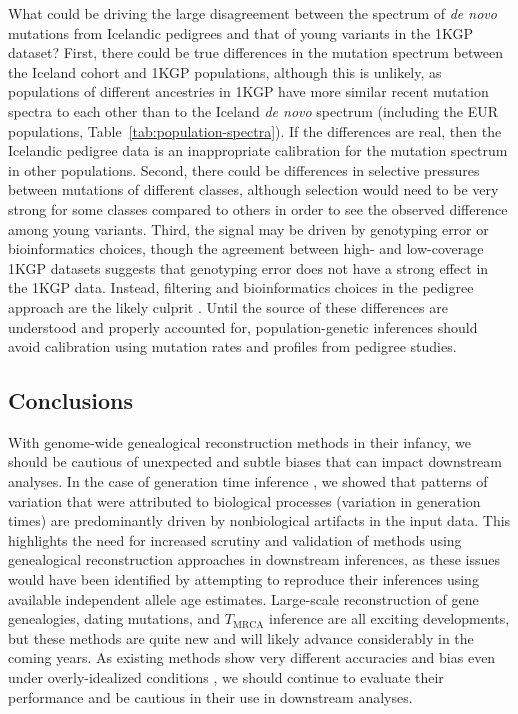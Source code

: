 \documentclass[]{article}
\begin{document}
What could be driving the large disagreement between the spectrum of \emph{de
novo} mutations from Icelandic pedigrees and that of young variants in the 1KGP
dataset? First, there could be true differences in the mutation spectrum
between the Iceland cohort and 1KGP populations, although this is unlikely, as
populations of different ancestries in 1KGP have more similar recent mutation
spectra to each other than to the Iceland \emph{de novo} spectrum (including
the EUR populations, Table~\ref{tab:population-spectra}). If the differences
are real, then the Icelandic pedigree data is an inappropriate calibration for
the mutation spectrum in other populations. Second, there could be differences
in selective pressures between mutations of different classes, although
selection would need to be very strong for some classes compared to others in
order to see the observed difference among young variants.  Third, the signal
may be driven by genotyping error or bioinformatics choices, though the
agreement between high- and low-coverage 1KGP datasets suggests that genotyping
error does not have a strong effect in the 1KGP data. Instead, filtering and
bioinformatics choices in the pedigree approach are the likely culprit
\citep{bergeron2022mutationathon}. Until the source of these differences are
understood and properly accounted for, population-genetic inferences should
avoid calibration using mutation rates and profiles from pedigree studies.

\subsection*{Conclusions}

With genome-wide genealogical reconstruction methods in their infancy, we
should be cautious of unexpected and subtle biases that can impact downstream
analyses. In the case of generation time inference \citep{wang2023human}, we
showed that patterns of variation that were attributed to biological processes
(variation in generation times) are predominantly driven by nonbiological
artifacts in the input data. This highlights the need for increased scrutiny
and validation of methods using genealogical reconstruction approaches in
downstream inferences, as these issues would have been identified by attempting
to reproduce their inferences using available independent allele age estimates.
Large-scale reconstruction of gene genealogies, dating mutations, and
$T_\text{MRCA}$ inference are all exciting developments, but these methods are
quite new and will likely advance considerably in the coming years. As existing
methods show very different accuracies and bias even under overly-idealized
conditions \citep{brandt2022evaluation}, we should continue to evaluate their
performance and be cautious in their use in downstream analyses.



\end{document}
